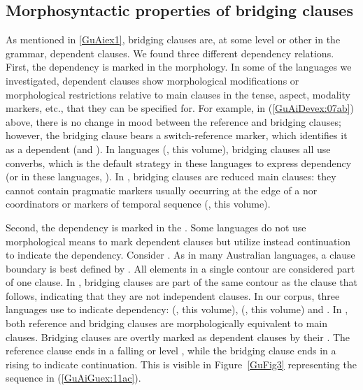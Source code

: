 \documentclass[output=paper]{LSP/langsci}
\begin{document}
\subsection{Morphosyntactic properties of bridging clauses}
\label{GuAi2.3Morphosy.brid.cl}
As mentioned in \ref{GuAiex1}, bridging clauses are, at some level or other in the grammar, dependent clauses. We found three different dependency relations. First, the dependency is marked in the morphology. In some of the languages we investigated, dependent clauses show morphological modifications or morphological restrictions relative to main clauses in the tense, aspect, modality markers, etc., that they can be specified for. For example, in (\ref{GuAiDevex:07ab}) above, there is no change in mood between the reference and bridging clauses; however, the bridging clause bears a switch-reference marker, which identifies it as a dependent (and ). In  languages (\citeauthor{anker18}, this volume), bridging clauses all use converbs, which is the default strategy in these languages to express dependency (or in these languages, ). In , bridging clauses are reduced main clauses: they cannot contain pragmatic markers usually occurring at the edge of a  nor coordinators or markers of temporal sequence (\citeauthor{jarkey18}, this volume). 

Second, the dependency is marked in the . Some languages do not use morphological means to mark dependent clauses but utilize instead continuation  to indicate the dependency. Consider  \citep[][5, 10]{McKay.2008}. As in many Australian languages, a clause boundary is best defined by . All elements in a single  contour are considered part of one clause. In , bridging clauses are part of the same  contour as the clause that follows, indicating that they are not independent clauses. In our corpus, three languages use  to indicate dependency:  (\citeauthor{guerinchap18}, this volume),  (\citeauthor{sarvasy18}, this volume) and  \citep{Pensalfini}. In , both reference and bridging clauses are morphologically equivalent to main clauses. Bridging clauses are overtly marked as dependent clauses by their . The reference clause ends in a falling or level , while the bridging clause ends in a rising  to indicate continuation. This is visible in Figure~\ref{GuFig3} representing the sequence in (\ref{GuAiGuex:11ac}). 
\end{document}
